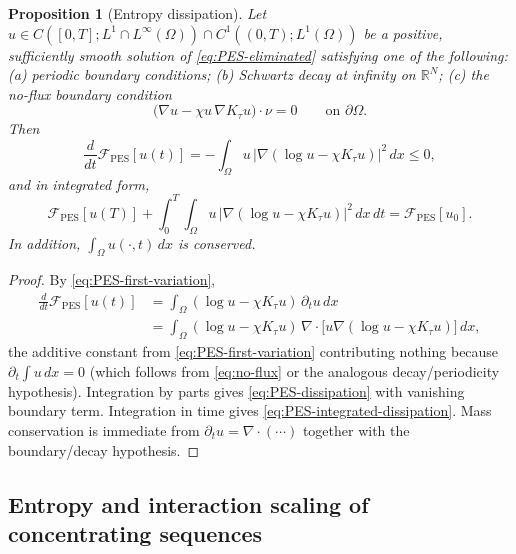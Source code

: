 \documentclass[11pt,reqno]{amsart}
\newtheorem{proposition}[theorem]{Proposition}
\theoremstyle{definition}
\theoremstyle{remark}
\newcommand{\R}{\mathbb{R}}
\newcommand{\Free}{\mathcal{F}}
\newcommand{\Div}{\nabla\!\cdot}
\begin{document}
\begin{proposition}[Entropy dissipation]\label{prop:PES-dissipation}
Let $u\in C([0,T];L^{1}\cap L^{\infty}(\Omega))\cap C^{1}((0,T);L^{1}(\Omega))$ be a positive, sufficiently smooth solution of \eqref{eq:PES-eliminated} satisfying one of the following: (a) periodic boundary conditions; (b) Schwartz decay at infinity on $\R^{N}$; (c) the no-flux boundary condition
\begin{equation}\label{eq:no-flux}
        \bigl(\nabla u-\chi u\,\nabla K_\tau u\bigr)\cdot\nu=0
        \qquad\text{on }\partial\Omega.
\end{equation}
Then
\begin{equation}\label{eq:PES-dissipation}
        \frac{d}{dt}\Free_{\mathrm{PES}}[u(t)]
        =-\int_\Omega u\,\bigl|\nabla(\log u-\chi K_\tau u)\bigr|^{2}\,dx\le 0,
\end{equation}
and in integrated form,
\begin{equation}\label{eq:PES-integrated-dissipation}
        \Free_{\mathrm{PES}}[u(T)]+\int_0^T\!\!\int_\Omega u\,\bigl|\nabla(\log u-\chi K_\tau u)\bigr|^{2}\,dx\,dt
        =\Free_{\mathrm{PES}}[u_0].
\end{equation}
In addition, $\int_\Omega u(\cdot,t)\,dx$ is conserved.
\end{proposition}

\begin{proof}
By \eqref{eq:PES-first-variation},
\[
\begin{aligned}
        \frac{d}{dt}\Free_{\mathrm{PES}}[u(t)]
        &=\int_\Omega(\log u-\chi K_\tau u)\,\partial_t u\,dx\\
        &=\int_\Omega(\log u-\chi K_\tau u)\,\Div\bigl[u\nabla(\log u-\chi K_\tau u)\bigr]\,dx,
\end{aligned}
\]
the additive constant from \eqref{eq:PES-first-variation} contributing nothing because $\partial_t\int u\,dx=0$ (which follows from \eqref{eq:no-flux} or the analogous decay/periodicity hypothesis). Integration by parts gives \eqref{eq:PES-dissipation} with vanishing boundary term. Integration in time gives \eqref{eq:PES-integrated-dissipation}. Mass conservation is immediate from $\partial_t u=\Div(\cdots)$ together with the boundary/decay hypothesis.
\end{proof}

\subsection{Entropy and interaction scaling of concentrating sequences}
\label{subsec:concentration-scaling}
\end{document}
